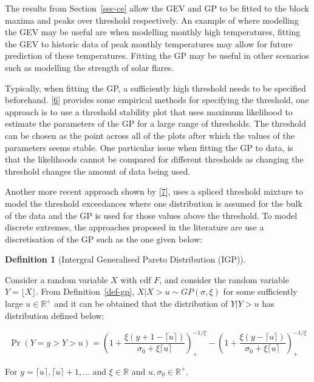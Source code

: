 \documentclass[
  10pt,
  a4paper,
]{scrreprt}
\theoremstyle{definition}
\newtheorem{definition}{Definition}[section]
\theoremstyle{plain}
\theoremstyle{plain}
\theoremstyle{plain}
\theoremstyle{remark}
\begin{document}
{The results from Section~\ref{sec-ce} allow the GEV and GP to be fitted
to the block maxima and peaks over threshold respectively. An example of
where modelling the GEV may be useful are when modelling monthly high
temperatures, fitting the GEV to historic data of peak monthly
temperatures may allow for future prediction of these temperatures.
Fitting the GP may be useful in other scenarios such as modelling the
strength of solar flares.

Typically, when fitting the GP, a sufficiently high threshold needs to
be specified beforehand. {[}\protect\hyperlink{ref-coles2001}{6}{]}
provides some empirical methods for specifying the threshold, one
approach is to use a threshold stability plot that uses maximum
likelihood to estimate the parameters of the GP for a large range of
thresholds. The threshold can be chosen as the point across all of the
plots after which the values of the parameters seems stable. One
particular issue when fitting the GP to data, is that the likelihoods
cannot be compared for different thresholds as changing the threshold
changes the amount of data being used.

Another more recent approach shown by
{[}\protect\hyperlink{ref-mac2012}{7}{]}, uses a spliced threshold
mixture to model the threshold exceedances where one distribution is
assumed for the bulk of the data and the GP is used for those values
above the threshold. To model discrete extremes, the approaches proposed
in the literature are use a discretisation of the GP such as the one
given below:

\begin{definition}[Intergral Generalised Pareto Distribution
(IGP)]\protect\hypertarget{def-igp}{}\label{def-igp}

Consider a random variable \(X\) with cdf \(F\), and consider the random
variable \(Y=\lfloor X \rfloor\). From Definition~\ref{def-gp},
\(X|X>u \sim GP(\sigma, \xi)\) for some sufficiently large
\(u\in \mathbb R^+\) and it can be obtained that the distribution of
\(Y|Y>u\) has distribution defined below:

\[
\Pr(Y=y>Y>u) = \left(1+\displaystyle\frac{\xi(y+1-\lceil u\rceil)}{\sigma_0+\xi\lceil u\rceil}\right)_+^{-1/\xi}-\left(1+\displaystyle\frac{\xi(y-\lceil u\rceil)}{\sigma_0+\xi\lceil u\rceil}\right)_+^{-1/\xi}
\]

For \(y=\lceil u\rceil,\lceil u\rceil+1, \ldots\) and
\(\xi \in \mathbb R\) and \(u, \sigma_0 \in \mathbb R^+.\)

\end{definition}

}
\end{document}
